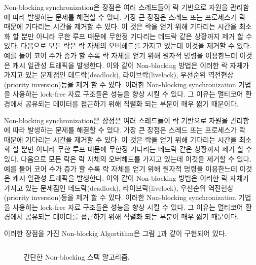 Non-blocking synchronization은 장점은 여러 스레드들이 락 기반으로 자원을 관리함에 따라
 발생하는 문제를 해결할 수 있다. 
가장 큰 장점은 스레드 또는 프로세스가 락 때문에 기다리는 시간을 제거할 수 있다.
이 것은 락을 얻기 위해 기다리는 시간을 최소화 할 뿐만 아니라 무한 루프 때문에 무한정 기다리는 
데드락 같은 상황까지 제거 할 수 있다. 
다음으로 모든 락은 락 자체의 오버헤드를 가지고 있는데 이것을 제거할 수 있다. 
예를 들어 코어 수가 증가 할 수록 락 자체를 얻기 위해 원자적 명령을 이용한느데 이것은 캐시 일관성 트래픽을 
발생한다. 
이와 같이 Non-blocking 방법은 이러한 락 자체가 가지고 있는 문제점인 데드락(deadlock), 라이브락(livelock), 
우선순위 역전현상(priority inversion)등을 제거 할 수 있다. 
이러한 Non-blocking synchronization 기법을 사용하는 lock-free 자료 구조들은 성능을 향상 시킬 수 있다. 
그 이유는 멀티코어 환경에서 공유되는 데이터를 접근하기 위해 직렬화 되는 부분이 매우 짧기 때문이다. 


Non-blocking synchronization은 장점은 여러 스레드들이 락 기반으로 자원을 관리함에 따라
 발생하는 문제를 해결할 수 있다. 
가장 큰 장점은 스레드 또는 프로세스가 락 때문에 기다리는 시간을 제거할 수 있다.
이 것은 락을 얻기 위해 기다리는 시간을 최소화 할 뿐만 아니라 무한 루프 때문에 무한정 기다리는 
데드락 같은 상황까지 제거 할 수 있다. 
다음으로 모든 락은 락 자체의 오버헤드를 가지고 있는데 이것을 제거할 수 있다. 
예를 들어 코어 수가 증가 할 수록 락 자체를 얻기 위해 원자적 명령을 이용한느데 이것은 캐시 일관성 트래픽을 
발생한다. 
이와 같이 Non-blocking 방법은 이러한 락 자체가 가지고 있는 문제점인 데드락(deadlock), 라이브락(livelock), 
우선순위 역전현상(priority inversion)등을 제거 할 수 있다. 
이러한 Non-blocking synchronization 기법을 사용하는 lock-free 자료 구조들은 성능을 향상 시킬 수 있다. 
그 이유는 멀티코어 환경에서 공유되는 데이터를 접근하기 위해 직렬화 되는 부분이 매우 짧기 때문이다. 


이러한 장점을 가진 Non-blockig Algortithm은 그림 \ref{fig:nonblockingstack}과 같이 구현되어 있다. 


\begin{figure}[h!]
\begin{center}
\inputminted[linenos,fontsize=\footnotesize,
tabsize=4]{c}{src/lockfree_stack.c}
\end{center}
\caption{간단한 Non-blocking 스택 알고리즘.}
\label{fig:nonblockingstack}
\end{figure}


